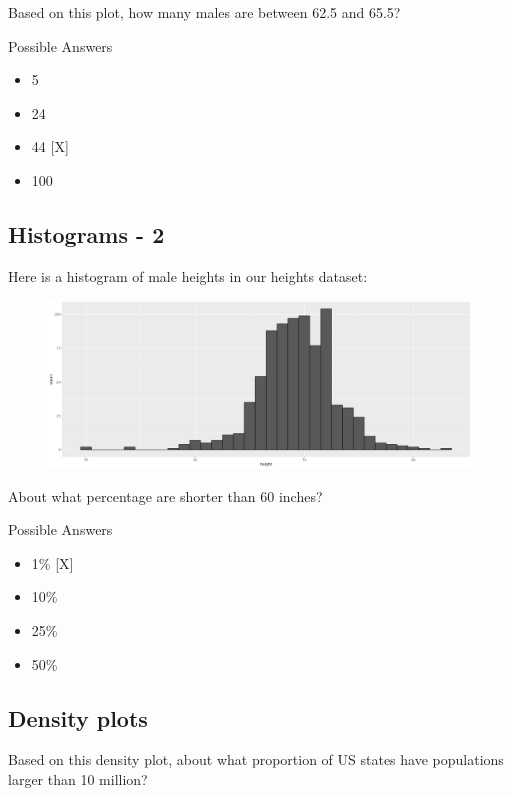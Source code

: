 \documentclass[]{article}
\providecommand{\tightlist}{%
  \setlength{\itemsep}{0pt}\setlength{\parskip}{0pt}}
\begin{document}
Based on this plot, how many males are between 62.5 and 65.5?

Possible Answers

\begin{itemize}
\tightlist
\item
  5
\item
  24
\item
  44 {[}X{]}
\item
  100
\end{itemize}

\subsection{\texorpdfstring{\textbf{Histograms -
2}}{Histograms - 2}}\label{histograms---2}

Here is a histogram of male heights in our heights dataset:

\begin{figure}
\centering
\includegraphics{img4.png}
\caption{}
\end{figure}

About what percentage are shorter than 60 inches?

Possible Answers

\begin{itemize}
\tightlist
\item
  1\% {[}X{]}
\item
  10\%
\item
  25\%
\item
  50\%
\end{itemize}

\subsection{\texorpdfstring{\textbf{Density
plots}}{Density plots}}\label{density-plots}

Based on this density plot, about what proportion of US states have
populations larger than 10 million?
\end{document}
